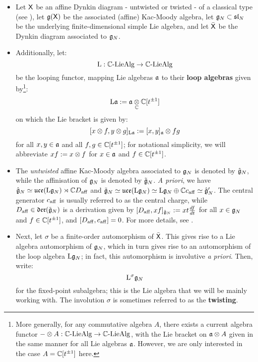             \begin{itemize}
                \item Let $\mathsf{X}$ be an affine Dynkin diagram - untwisted or twisted - of a classical type (see \cite[Chapter 4, Tables Aff 2 and 3, p. 55]{kac_infinite_dimensional_lie_algebras}), let $\mathfrak{g}(\mathsf{X})$ be the associated (affine) Kac-Moody algebra, let $\mathfrak{g}_N \subset \mathfrak{sl}_N$ be the underlying finite-dimensional simple Lie algebra, and let $\bar{\mathsf{X}}$ be the Dynkin diagram associated to $\mathfrak{g}_N$.
     
                \item Additionally, let:
                    $$\mathrm{L}: \mathbb{C}\text{-}\mathrm{Lie}\mathrm{Alg} \to \mathbb{C}\text{-}\mathrm{Lie}\mathrm{Alg}$$
                be the looping functor, mapping Lie algebras $\mathfrak{a}$ to their \textbf{loop algebras} given by\footnote{More generally, for any commutative algebra $A$, there exists a current algebra functor $- \tensor A: \bbC\-\Lie\Alg \to \bbC\-\Lie\Alg$, with the Lie bracket on $\a \tensor A$ given in the same manner for all Lie algebras $\mathfrak{a}$. However, we are only interested in the case $A = \mathbb{C}[t^{\pm 1}]$ here.}:
                    $$\Loop \a := \a \tensor_{\bbC} \bbC[t^{\pm 1}]$$
                on which the Lie bracket is given by:
                    $$[x \tensor f, y \tensor g]_{\Loop \a} := [x, y]_{\a} \tensor fg$$
                for all $x, y \in \mathfrak{a}$ and all $f, g \in \mathbb{C}[t^{\pm 1}]$; for notational simplicity, we will abbreviate $xf := x \tensor f$ for $x \in \mathfrak{a}$ and $f \in \mathbb{C}[t^{\pm 1}]$.
    
                \item The \textit{untwisted} affine Kac-Moody algebra associated to $\mathfrak{g}_N$ is denoted by $\hat{\mathfrak{g}}_N$, while the affinisation of $\mathfrak{g}_N$ is denoted by $\tilde{\mathfrak{g}}_N$. \textit{A priori}, we have $\hat{\mathfrak{g}}_N \simeq \mathfrak{uce}( \mathrm{L} \mathfrak{g}_N ) \rtimes \mathbb{C} D_{\mathrm{aff}}$ and $\tilde{\mathfrak{g}}_N \simeq \mathfrak{uce}( \mathrm{L} \mathfrak{g}_N ) \simeq \mathrm{L} \mathfrak{g}_N \oplus \mathbb{C} c_{\mathrm{aff}} \simeq \hat{\mathfrak{g}}_N'$. The central generator $c_{\mathrm{aff}}$ is usually referred to as the central charge, while $D_{\mathrm{aff}} \in \mathfrak{der}(\tilde{\mathfrak{g}}_N)$ is a derivation given by $[D_{\mathrm{aff}}, xf]_{\hat{\mathfrak{g}}_N} := x t \frac{df}{dt}$ for all $x \in \mathfrak{g}_N$ and $f \in \mathbb{C}[t^{\pm 1}]$, and $[D_{\mathrm{aff}}, c_{\mathrm{aff}}] = 0$. For more details, see \cite[Chapter 7]{kac_infinite_dimensional_lie_algebras}.
                
                \item Next, let $\sigma$ be a finite-order automorphism of $\bar{\mathsf{X}}$. This gives rise to a Lie algebra automorphism of $\mathfrak{g}_N$, which in turn gives rise to an automorphism of the loop algebra $\mathrm{L}\mathfrak{g}_N$; in fact, this automorphism is involutive \textit{a priori}. Then, write:
                    $$\mathrm{L}^{\sigma}\mathfrak{g}_N$$
                for the fixed-point subalgebra; this is the Lie algebra that we will be mainly working with. The involution $\sigma$ is sometimes referred to as the \textbf{twisting}.
            \end{itemize}
    
